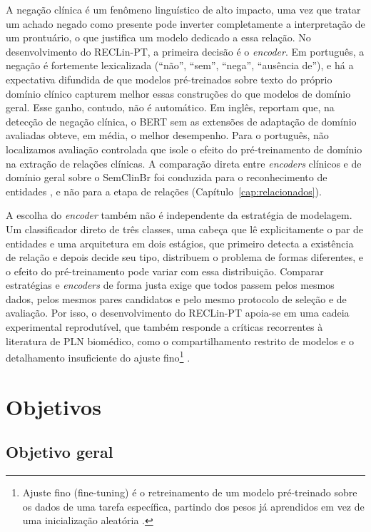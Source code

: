 A negação clínica é um fenômeno linguístico de alto impacto, uma vez que tratar um
achado negado como presente pode inverter completamente a interpretação de um
prontuário, o que justifica um modelo dedicado a essa relação. No desenvolvimento
do RECLin-PT, a primeira decisão é o \emph{encoder}. Em português, a negação é fortemente
lexicalizada (``não'', ``sem'', ``nega'', ``ausência de''), e há a expectativa
difundida de que modelos
pré-treinados sobre texto do próprio domínio clínico capturem melhor essas
construções do que modelos de domínio geral. Esse ganho, contudo, não é
automático. Em inglês,  reportam que, na detecção de
negação clínica, o BERT sem as extensões de adaptação de domínio avaliadas obteve, em
média, o melhor desempenho. Para o português, não localizamos
avaliação controlada que isole o efeito do pré-treinamento de domínio na extração
de relações clínicas. A comparação direta entre \emph{encoders} clínicos e de
domínio geral sobre o SemClinBr foi conduzida para o reconhecimento de entidades
\cite{almeida_2026_benchmarkner}, e não para a etapa de relações
(Capítulo~\ref{cap:relacionados}).

A escolha do \emph{encoder} também não é independente da estratégia de modelagem.
Um classificador direto de três classes, uma cabeça que lê explicitamente o par de
entidades e uma arquitetura em dois estágios, que primeiro detecta a existência de
relação e depois decide seu tipo, distribuem o problema de formas diferentes, e o
efeito do pré-treinamento pode variar com essa distribuição. Comparar estratégias e
\emph{encoders} de forma justa exige que todos passem pelos mesmos dados, pelos
mesmos pares candidatos e pelo mesmo protocolo de seleção e de avaliação. Por isso, o
desenvolvimento do RECLin-PT apoia-se em uma cadeia experimental reprodutível, que
também responde a críticas recorrentes à literatura de PLN biomédico, como o
compartilhamento restrito de modelos e o detalhamento insuficiente do ajuste
fino\footnote{Ajuste fino (\foreignlanguage{english}{fine-tuning}) é o
retreinamento de um modelo pré-treinado sobre os dados de uma tarefa específica,
partindo dos pesos já aprendidos em vez de uma inicialização aleatória
\cite{devlin_2019_bert}.} \cite{navarro_2023_revisao,shimaoka_2026_revisao}.

\section{Objetivos}

\subsection{Objetivo geral}

